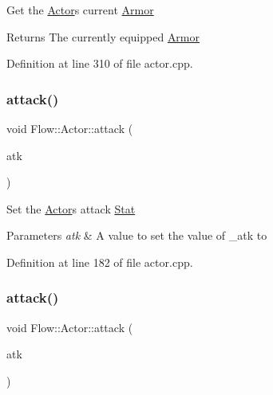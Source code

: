 Get the \hyperlink{class_flow_1_1_actor}{Actor}\textquotesingle{}s current \hyperlink{class_flow_1_1_armor}{Armor} \begin{DoxyReturn}{Returns}
The currently equipped \hyperlink{class_flow_1_1_armor}{Armor} 
\end{DoxyReturn}


Definition at line 310 of file actor.\+cpp.

\hypertarget{class_flow_1_1_actor_a7c829abc5329c2506ea0ffe5b029c1a9}{}\label{class_flow_1_1_actor_a7c829abc5329c2506ea0ffe5b029c1a9} 
\subsubsection{\texorpdfstring{attack()}{attack()}\hspace{0.1cm}{\footnotesize\ttfamily [1/3]}}
{\footnotesize\ttfamily void Flow\+::\+Actor\+::attack (\begin{DoxyParamCaption}\item[{unsigned char}]{atk }\end{DoxyParamCaption})}

Set the \hyperlink{class_flow_1_1_actor}{Actor}\textquotesingle{}s attack \hyperlink{class_flow_1_1_stat}{Stat} 
\begin{DoxyParams}{Parameters}
{\em atk} & A value to set the value of \+\_\+atk to \\
\hline
\end{DoxyParams}


Definition at line 182 of file actor.\+cpp.

\hypertarget{class_flow_1_1_actor_a7aee4043e372b4e1391418daa5728958}{}\label{class_flow_1_1_actor_a7aee4043e372b4e1391418daa5728958} 
\subsubsection{\texorpdfstring{attack()}{attack()}\hspace{0.1cm}{\footnotesize\ttfamily [2/3]}}
{\footnotesize\ttfamily void Flow\+::\+Actor\+::attack (\begin{DoxyParamCaption}\item[{const \hyperlink{class_flow_1_1_b_stat}{B\+Stat} \&}]{atk }\end{DoxyParamCaption})}


